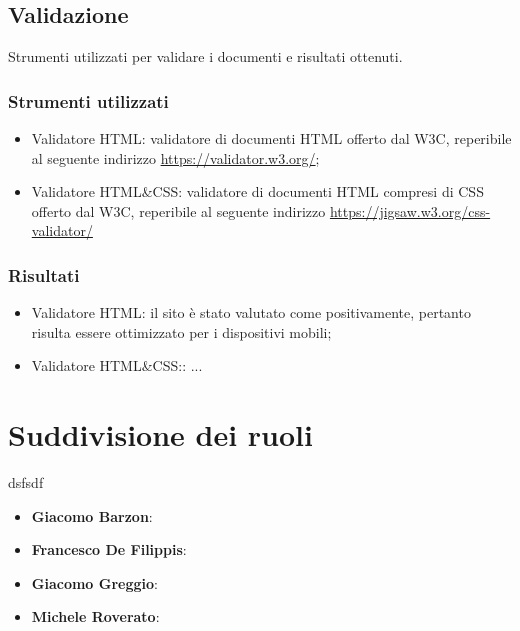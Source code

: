 \documentclass[12pt]{article}
\begin{document}
	\subsection{Validazione}
	Strumenti utilizzati per validare i documenti e risultati ottenuti.
	\subsubsection{Strumenti utilizzati}
	\begin{itemize}
		\item Validatore HTML: validatore di documenti HTML offerto dal W3C, reperibile al seguente indirizzo \url{https://validator.w3.org/};
		\item Validatore HTML\&CSS: validatore di documenti HTML compresi di CSS offerto dal W3C, reperibile al seguente indirizzo \url{https://jigsaw.w3.org/css-validator/}
	\end{itemize}
	\subsubsection{Risultati}
		\begin{itemize}
			\item Validatore HTML: il sito è stato valutato come positivamente, pertanto risulta essere ottimizzato per i dispositivi mobili;
			\item Validatore HTML\&CSS:: ...
		\end{itemize}
	
	\section{Suddivisione dei ruoli}
	dsfsdf
	\begin{itemize}
		\item \textbf{Giacomo Barzon}:
		\item \textbf{Francesco De Filippis}: 
		\item \textbf{Giacomo Greggio}:
		\item \textbf{Michele Roverato}:
	\end{itemize}
\end{document}
